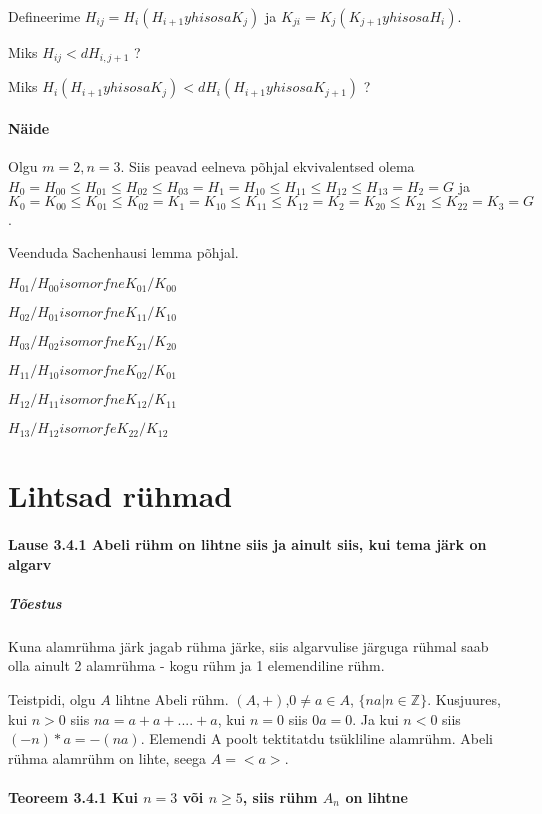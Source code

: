 \documentclass[12pt]{report}
\numberwithin{equation}{section}
\theoremstyle{definition}
\theoremstyle{plain}
\begin{document}
Defineerime $H_{ij} = H_i(H_{i+1} yhisosa K_j)$ ja $K_{ji} = K_j (K_{j+1} yhisosa H_i)$. 


Miks $H_{ij} <d H_{i,j+1}$ ?


Miks $H_i( H_{i+1} yhisosa K_j) <d H_i(H_{i+1} yhisosa K_{j+1})$ ?

\paragraph{Näide}

Olgu $ m=2, n =3$. Siis peavad eelneva põhjal ekvivalentsed olema $H_0 = H_{00} \leq H_{01} \leq H_{02} \leq H_{03} = H_1=H_{10} \leq H_{11} \leq H_{12} \leq H_{13} = H_2 = G$ ja $K_0 = K_{00} \leq K_{01} \leq K_{02} = K_1 = K_{10} \leq K_{11} \leq K_{12} = K_{2} = K_{20} \leq K_{21} \leq K_{22} = K_3 = G$.

Veenduda Sachenhausi lemma põhjal. 

$H_{01} / H_{00} isomorfne K_{01} / K_{00}$

$H_{02}/ H_{01} isomorfne K_{11}/K_{10}$

$H_{03}/ H_{02} isomorfne K_{21}/K_{20}$

$H_{11} / H_{10} isomorfne K_{02}/K_{01}$

$H_{12} / H_{11} isomorfne K_{12}/K_{11}$

$H_{13} / H_{12} isomorfe K_{22}/K_{12}$

\section{Lihtsad r\"uhmad}

\paragraph{Lause 3.4.1 Abeli rühm on lihtne siis ja ainult siis, kui tema järk on algarv}

\subparagraph{Tõestus}
Kuna alamrühma järk jagab rühma järke, siis algarvulise järguga rühmal saab olla ainult 2 alamrühma - kogu rühm ja 1 elemendiline rühm.

Teistpidi, olgu $A$ lihtne Abeli rühm. $(A,+)$,$0 \neq a \in A$, $ \{na | n \in \mathbb{Z}\}$. Kusjuures, kui $n >0 $ siis $na = a + a + .... + a$, kui $n=0$ siis $0a = 0$. Ja kui $n < 0$ siis $(-n)*a = -(na)$. Elemendi A poolt tektitatdu ts\"ukliline alamr\"uhm. Abeli rühma alamr\"uhm on lihte, seega $A = < a >$. 

\paragraph{Teoreem 3.4.1 Kui $n = 3$ või $n \geq 5$, siis rühm $A_n$ on lihtne }
   
\end{document}
